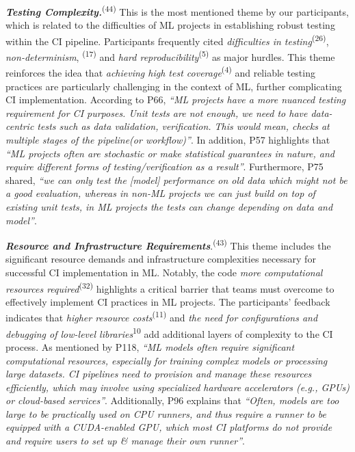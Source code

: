 \textbf{\textit{Testing Complexity.}}\textsuperscript{(44)}
This is the most mentioned theme by our participants, which is related to the difficulties of ML projects in establishing robust testing within the CI pipeline. Participants frequently cited \textit{difficulties in testing}\textsuperscript{(26)}, \textit{non-determinism}, \textsuperscript{(17)} and \textit{hard reproducibility}\textsuperscript{(5)} as major hurdles. This theme reinforces the idea that \textit{achieving high test coverage}\textsuperscript{(4)} and reliable testing practices are particularly challenging in the context of ML, further complicating CI implementation.
According to P66, \textit{``ML projects have a more nuanced testing requirement for CI purposes. Unit tests are not enough, we need to have data-centric tests such as data validation, verification. This would mean, checks at multiple stages of the pipeline(or workflow)''}. In addition, P57 highlights that \textit{``ML projects often are stochastic or make statistical guarantees in nature, and require different forms of testing/verification as a result''}. Furthermore, P75 shared, \textit{``we can only test the [model] performance on old data which might not be a good evaluation, whereas in non-ML projects we can just build on top of existing unit tests, in ML projects the tests can change depending on data and model''}. 

\textbf{\textit{Resource and Infrastructure Requirements}}.\textsuperscript{(43)}
This theme includes the significant resource demands and infrastructure complexities necessary for successful CI implementation in ML.
Notably, the code \textit{more computational resources required}\textsuperscript{(32)} highlights a critical barrier that teams must overcome to effectively implement CI practices in ML projects. The participants’ feedback indicates that \textit{higher resource costs}\textsuperscript{(11)} and \textit{the need for configurations and debugging of low-level libraries}\textsuperscript{10} add additional layers of complexity to the CI process. As mentioned by P118, \textit{``ML models often require significant computational resources, especially for training complex models or processing large datasets. CI pipelines need to provision and manage these resources efficiently, which may involve using specialized hardware accelerators (e.g., GPUs) or cloud-based services''}. Additionally, P96 explains that \textit{``Often, models are too large to be practically used on CPU runners, and thus require a runner to be equipped with a CUDA-enabled GPU, which most CI platforms do not provide and require users to set up \& manage their own runner''}.

